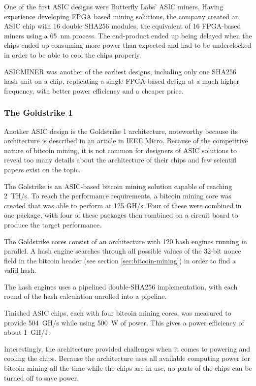 One of the first ASIC designs were Butterfly Labs' ASIC miners. Having experience developing
FPGA based mining solutions, the company created an ASIC chip with 16 double SHA256 modules,
the equivalent of 16 FPGA-based miners using a 65~nm process. The end-product ended up being
delayed when the chips ended up consuming more power than expected and had to be underclocked
in order to be able to cool the chips properly.

ASICMINER was another of the earliest designs, including only one SHA256 hash unit on a chip,
replicating a single FPGA-based design at a much higher frequency, with better power efficiency
and a cheaper price. \cite{bespoke-silicon}

\subsubsection{The Goldstrike 1}
Another ASIC design is the Goldstrike 1 architecture, noteworthy because its architecture is
described in an article in IEEE Micro. Because of the competitive nature of bitcoin mining,
it is not common for designers of ASIC solutions to reveal too many details about the architecture
of their chips and few scientifi papers exist on the topic.

The Golstrike is an ASIC-based bitcoin mining solution capable of reaching 2~TH/s. To reach the performance
requirements, a bitcoin mining core was created that was able to perform at 125 GH/s. Four of
these were combined in one package, with four of these packages then combined on a circuit board
to produce the target performance.

The Goldstrike cores consist of an architecture with 120 hash engines running in parallel.
A hash engine searches through all possible values of the 32-bit nonce field in the bitcoin header
(see section \ref{sec:bitcoin-mining}) in order to find a valid hash.

The hash engines uses a pipelined double-SHA256 implementation, with each round of the hash calculation
unrolled into a pipeline.

Tinished ASIC chips, each with four bitcoin mining cores, was measured to provide 504~GH/s while using
500~W of power. This gives a power efficiency of about 1~GH/J.

Interestingly, the architecture provided challenges when it comes to powering and cooling the chips.
Because the architecture uses all available computing power for bitcoin mining all the time while
the chips are in use, no parts of the chips can be turned off to save power. \cite{goldstrike}

